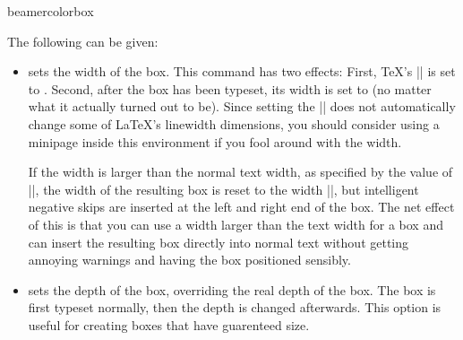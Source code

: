 \begin{environment}{{beamercolorbox}}
  
  The following  can be given:
  \begin{itemize}
  \item {} sets the width of the box. This
    command has two effects: First, \TeX's |\hsize| is set to
    . Second, after the box has been typeset, its width is
    set to  (no matter what it actually turned out to
    be). Since setting the |\hsize| does not automatically change some
    of \LaTeX's linewidth dimensions, you should consider using a
    minipage inside this environment if you fool around with the
    width.

    If the width is larger than the normal text width, as specified by
    the value of |\textwidth|, the width of the resulting box is reset
    to the width |\textwidth|, but intelligent negative skips are
    inserted at the left and right end of the box. The net effect of
    this is that you can use a width larger than the text width for a
    box and can insert the resulting box directly into normal text
    without getting annoying warnings and having the box positioned
    sensibly.
  \item {} sets the depth of the box,
    overriding the real depth of the box. The box is first typeset
    normally, then the depth is changed afterwards. This option is
    useful for creating boxes that have guarenteed size.


\end{itemize}
\end{environment}
